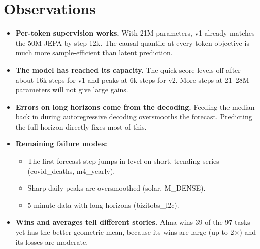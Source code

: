 \documentclass[10pt,twocolumn]{extarticle}
\begin{document}
\section{Observations}
\begin{itemize}
\item \textbf{Per-token supervision works.} With 21M parameters, v1 already
matches the 50M JEPA by step 12k. The causal quantile-at-every-token objective
is much more sample-efficient than latent prediction.
\item \textbf{The model has reached its capacity.} The quick score levels off after
about 16k steps for v1 and peaks at 6k steps for v2. More steps at 21--28M
parameters will not give large gains.
\item \textbf{Errors on long horizons come from the decoding.} Feeding the median
back in during autoregressive decoding oversmooths the forecast. Predicting the
full horizon directly fixes most of this.
\item \textbf{Remaining failure modes:}
\begin{itemize}
\item The first forecast step jumps in level on short, trending series
(covid\_deaths, m4\_yearly).
\item Sharp daily peaks are oversmoothed (solar, M\_DENSE).
\item 5-minute data with long horizons (bizitobs\_l2c).
\end{itemize}
\item \textbf{Wins and averages tell different stories.} Alma wins 39 of the 97
tasks yet has the better geometric mean, because its wins are large (up to
2$\times$) and its losses are moderate.
\end{itemize}
\end{document}
